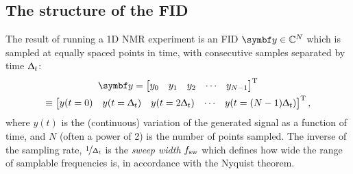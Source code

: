 \subsection{The structure of the \acs{FID}}
The result of running a \ac{1D} \ac{NMR} experiment is an \ac{FID} $\by \in
\mathbb{C}^N$ which is sampled at equally spaced points in time, with
consecutive samples separated by time $\Updelta_t$:
\begin{equation}
    \begin{gathered}
        \by = \begin{bmatrix}
            y_0 & y_1 & y_2 & \cdots & y_{N-1}
      \end{bmatrix}\T\\
      \equiv
      \begin{bmatrix}
          y(t=0) & y(t=\Dt) & y(t=2\Dt) & \cdots & y(t=(N-1)\Dt)
      \end{bmatrix}\T,
    \end{gathered}
\end{equation}
where $y(t)$ is the (continuous) variation of the generated signal as a
function of time,
and $N$ (often a power of 2) is the number of points sampled. The inverse of
the sampling rate,
$\nicefrac{1}{\Updelta_t}$ is the \emph{sweep width} $f_{\mathrm{sw}}$ which
defines how wide the range of samplable frequencies is, in accordance with the
Nyquist theorem\cite{Shannon1949}.

